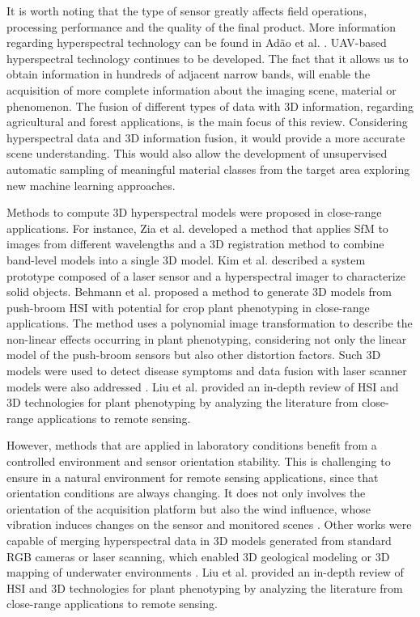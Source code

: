 It is worth noting that the type of sensor greatly affects field operations, processing performance and the quality of the final product. More information regarding hyperspectral technology can be found in Adão et al. \cite{adao_hyperspectral_2017}. UAV-based hyperspectral technology continues to be developed. The fact that it allows us to obtain information in hundreds of adjacent narrow bands, will enable the acquisition of more complete information about the imaging scene, material or phenomenon. The fusion of different types of data with 3D information, regarding agricultural and forest applications, is the main focus of this review. Considering hyperspectral data and 3D information fusion, it would provide a more accurate scene understanding. This would also allow the development of unsupervised automatic sampling of meaningful material classes from the target area exploring new machine learning approaches. 

Methods to compute 3D hyperspectral models were proposed in close-range applications. For instance, Zia et al. \cite{zia_3d_2015} developed a method that applies SfM to images from different wavelengths and a 3D registration method to combine band-level models into a single 3D model. Kim et al. \cite{kim_3d_2012} described a system prototype composed of a laser sensor and a hyperspectral imager to characterize solid objects. Behmann et al. \cite{behmann_calibration_2015} proposed a method to generate 3D models from push-broom HSI with potential for crop plant phenotyping in close-range applications. The method uses a polynomial image transformation to describe the non-linear effects occurring in plant phenotyping, considering not only the linear model of the push-broom sensors but also other distortion factors. Such 3D models were used to detect disease symptoms \cite{roscher_detection_2016} and data fusion with laser scanner models were also addressed \cite{behmann_generation_2016}. Liu et al. \cite{liu_hyperspectral_2020} provided an in-depth review of HSI and 3D technologies for plant phenotyping by analyzing the literature from close-range applications to remote sensing.

However, methods that are applied in laboratory conditions benefit from a controlled environment and sensor orientation stability. This is challenging to ensure in a natural environment for remote sensing applications, since that orientation conditions are always changing. It does not only involves the orientation of the acquisition platform but also the wind influence, whose vibration induces changes on the sensor and monitored scenes \cite{kalisperakis_leaf_2015}. Other works were capable of merging hyperspectral data in 3D models generated from standard RGB cameras or laser scanning, which enabled 3D geological modeling \cite{nieto_3d_2010} or 3D mapping of underwater environments \cite{ferrera_hyperspectral_2021}. Liu et al. \cite{liu_hyperspectral_2020} provided an in-depth review of HSI and 3D technologies for plant phenotyping by analyzing the literature from close-range applications to remote sensing.

